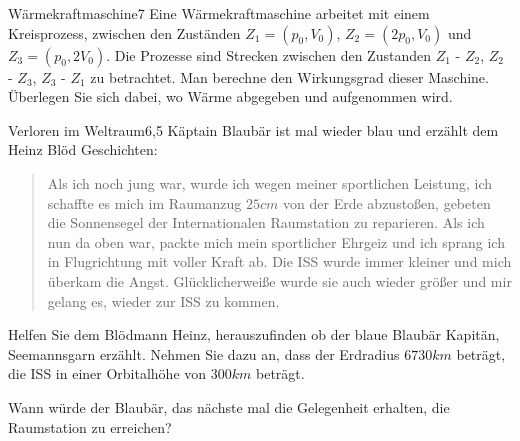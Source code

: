 \begin{problem}{Wärmekraftmaschine}{7}
Eine Wärmekraftmaschine arbeitet mit einem Kreisprozess, zwischen den Zuständen $Z_1=(p_0,V_0)$, $Z_2=(2p_0,V_0)$ und $Z_3=(p_0,2V_0)$. Die Prozesse sind Strecken zwischen den Zustanden $Z_1$ - $Z_2$, $Z_2$ - $Z_3$, $Z_3$ - $Z_1$ zu betrachtet. Man berechne den Wirkungsgrad dieser Maschine. Überlegen Sie sich dabei, wo Wärme abgegeben und aufgenommen wird.
\end{problem}

\begin{problem}{Verloren im Weltraum}{6,5}
Käptain Blaubär ist mal wieder blau und erzählt dem Heinz Blöd Geschichten:
\begin{quote}
 Als ich noch jung war, wurde ich wegen meiner sportlichen Leistung, ich schaffte es mich im Raumanzug $25\unit{cm}$ von der Erde abzustoßen, gebeten die Sonnensegel der Internationalen Raumstation zu reparieren. Als ich nun da oben war, packte mich mein sportlicher Ehrgeiz und ich sprang ich in Flugrichtung mit voller Kraft ab. Die ISS wurde immer kleiner und mich überkam die Angst. Glücklicherweiße wurde sie auch wieder größer und mir gelang es, wieder zur ISS zu kommen.
\end{quote}
\begin{abcenum}
 \item Helfen Sie dem Blödmann Heinz, herauszufinden ob der blaue Blaubär Kapitän, Seemannsgarn erzählt. Nehmen Sie dazu an, dass der Erdradius $6730\unit{km}$ beträgt, die ISS in einer Orbitalhöhe von $300\unit{km}$ beträgt.
 \item Wann würde der Blaubär, das nächste mal die Gelegenheit erhalten, die Raumstation zu erreichen?
\end{abcenum}
\end{problem}

